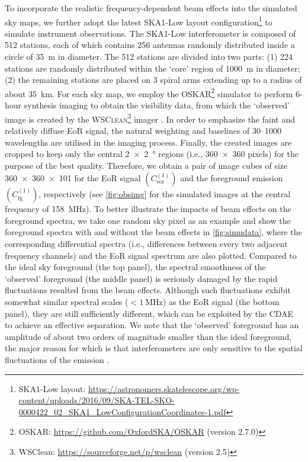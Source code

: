 \documentclass[fleqn,usenatbib]{mnras}
\newcommand{\R}[1]{\mathrm{#1}}
\newcommand{\editone}[1]{{\leavevmode\color{cyan}#1}}
\newcommand{\edittwo}[1]{{\leavevmode\color{magenta}#1}}
\begin{document}
{To incorporate the realistic frequency-dependent beam effects into the
simulated sky maps, we further adopt the latest SKA1-Low layout
configuration\footnote{\raggedright%
  SKA1-Low layout:
  \url{https://astronomers.skatelescope.org/wp-content/uploads/2016/09/SKA-TEL-SKO-0000422_02_SKA1_LowConfigurationCoordinates-1.pdf}}
to simulate instrument observations.
The SKA1-Low interferometer is composed of 512 stations, each of which
contains 256 antennas randomly distributed inside a circle of
\SI{35}{\meter} in diameter.
The 512 stations are divided into two parts:
(1) 224 stations are randomly distributed within the `core' region of
\SI{1000}{\meter} in diameter;
(2) the remaining stations are placed on 3 spiral arms extending up to a
radius of about \SI{35}{\kilo\meter}.
For each sky map, we employ the \textsc{OSKAR}\footnote{%
  OSKAR: \url{https://github.com/OxfordSKA/OSKAR} (version 2.7.0)}
simulator \citep{mort2010} to perform 6-hour synthesis imaging
\edittwo{to obtain} the visibility data, from which the `observed'
image is created by the \textsc{WSClean}\footnote{%
  WSClean: \url{https://sourceforge.net/p/wsclean} (version 2.5)}
imager \citep{offringa2014}.
In order to emphasize the faint and relatively diffuse EoR signal, the
natural weighting and baselines of \numrange{30}{1000} wavelengths are
utilised in the imaging process.} %
Finally, the created images are cropped to keep only the central
\SI{2 x 2}{\degree} regions (i.e., \num{360 x 360} pixels) for the
purpose of the best quality.
Therefore, we obtain \editone{a pair of} image cubes of size
\num{360 x 360 x 101} for the EoR signal $\left( C_{\R{eor}}^{(1)} \right)$
and the foreground emission $\left( C_{\R{fg}}^{(1)} \right)$, respectively
\editone{%
(see \autoref{fig:obsimg} for the simulated images at the central frequency
of \SI{158}{\MHz}).
To better illustrate the impacts of beam effects on the foreground spectra,
\edittwo{%
we take one random sky pixel as an example and show the foreground
spectra with and without the beam effects in \autoref{fig:simudata}, where
the corresponding differential spectra (i.e., differences between every
two adjacent frequency channels) and the EoR signal spectrum are also
plotted.} %
Compared to the ideal sky foreground (the top panel), the spectral
smoothness of the `observed' foreground (the middle panel) is seriously
damaged by the rapid fluctuations resulted from the beam effects.} %
\edittwo{%
Although such fluctuations exhibit somewhat similar spectral scales
($< \SI{1}{\MHz}$) as the EoR signal (the bottom panel), they are
still sufficiently different, which can be exploited by the CDAE to achieve
an effective separation.
We note that the `observed' foreground has an amplitude of about two orders
of magnitude smaller than the ideal foreground, the major reason for which
is that interferometers are only sensitive to the spatial fluctuations of
the emission \citep[e.g.,][]{braun1985}.} %
\end{document}
